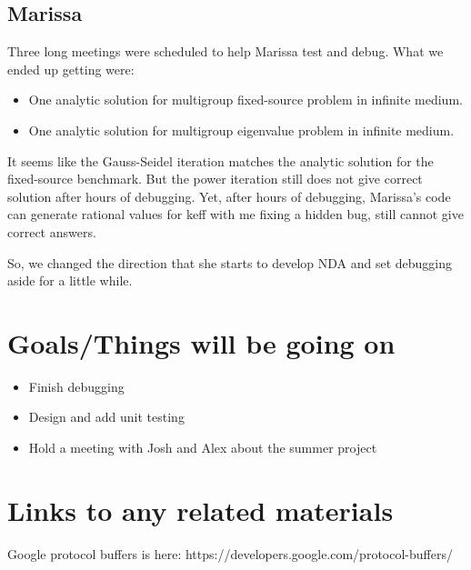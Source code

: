 \documentclass{article}
\begin{document}
\subsection{Marissa}
Three long meetings were scheduled to help Marissa test and debug. What we ended up 
getting were:
\begin{itemize}
	\item One analytic solution for multigroup fixed-source problem in infinite medium.
	\item One analytic solution for multigroup eigenvalue problem in infinite medium.
\end{itemize}

It seems like the Gauss-Seidel iteration matches the analytic solution for the fixed-source
benchmark. But the power iteration still does not give correct solution after hours of
debugging. Yet, after hours of debugging, Marissa's code can generate rational values 
for keff with me fixing a hidden bug, still cannot give correct answers.

So, we changed the direction that she starts to develop NDA and set debugging aside 
for a little while. 


\section{Goals/Things will be going on}
\begin{itemize}
	\item Finish debugging
	\item Design and add unit testing
	\item Hold a meeting with Josh and Alex about the summer project
\end{itemize}

\section{Links to any related materials}
Google protocol buffers is here: https://developers.google.com/protocol-buffers/



%
%
%

\end{document}
